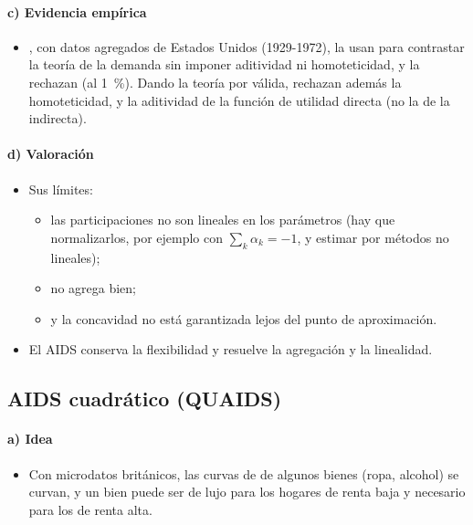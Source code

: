 \documentclass[11pt]{article}
\begin{document}
\paragraph{c) Evidencia empírica}

\begin{itemize}
\item \textcite{ChristensenJorgensonLau1975Utility}, con datos agregados de Estados Unidos (1929-1972), la usan para contrastar la teoría de la demanda sin imponer aditividad ni homoteticidad, y la rechazan (al 1~\%). Dando la teoría por válida, rechazan además la homoteticidad, y la aditividad de la función de utilidad directa (no la de la indirecta).
\end{itemize}

\paragraph{d) Valoración}

\begin{itemize}
\item Sus límites:
  \begin{itemize}
  \item las participaciones no son lineales en los parámetros (hay que normalizarlos, por ejemplo con $\sum_k\alpha_k=-1$, y estimar por métodos no lineales);
  \item no agrega bien;
  \item y la concavidad no está garantizada lejos del punto de aproximación.
  \end{itemize}
\item El AIDS conserva la flexibilidad y resuelve la agregación y la linealidad.
\end{itemize}

\subsection{AIDS cuadrático (QUAIDS)}\label{anexo:quaids}

\paragraph{a) Idea}

\begin{itemize}
\item Con microdatos británicos, las curvas de  de algunos bienes (ropa, alcohol) se curvan, y un bien puede ser de lujo para los hogares de renta baja y necesario para los de renta alta\nocite{BanksBlundellLewbel1997Quadratic}.
\end{itemize}
\end{document}
